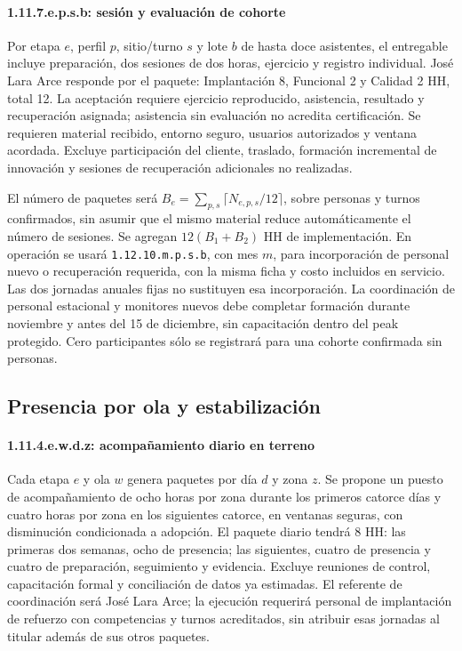\paragraph{1.11.7.e.p.s.b: sesión y evaluación de cohorte}
Por etapa $e$, perfil $p$, sitio/turno $s$ y lote $b$ de hasta doce asistentes, el entregable incluye preparación, dos sesiones de dos horas, ejercicio y registro individual. José Lara Arce responde por el paquete: Implantación 8, Funcional 2 y Calidad 2 HH, total 12. La aceptación requiere ejercicio reproducido, asistencia, resultado y recuperación asignada; asistencia sin evaluación no acredita certificación. Se requieren material recibido, entorno seguro, usuarios autorizados y ventana acordada. Excluye participación del cliente, traslado, formación incremental de innovación y sesiones de recuperación adicionales no realizadas.

El número de paquetes será $B_e=\sum_{p,s}\lceil N_{e,p,s}/12\rceil$, sobre personas y turnos confirmados, sin asumir que el mismo material reduce automáticamente el número de sesiones. Se agregan $12(B_1+B_2)$ HH de implementación. En operación se usará \texttt{1.12.10.m.p.s.b}, con mes $m$, para incorporación de personal nuevo o recuperación requerida, con la misma ficha y costo incluidos en servicio. Las dos jornadas anuales fijas no sustituyen esa incorporación. La coordinación de personal estacional y monitores nuevos debe completar formación durante noviembre y antes del 15 de diciembre, sin capacitación dentro del peak protegido. Cero participantes sólo se registrará para una cohorte confirmada sin personas.

\subsection{Presencia por ola y estabilización}
\paragraph{1.11.4.e.w.d.z: acompañamiento diario en terreno}
Cada etapa $e$ y ola $w$ genera paquetes por día $d$ y zona $z$. Se propone un puesto de acompañamiento de ocho horas por zona durante los primeros catorce días y cuatro horas por zona en los siguientes catorce, en ventanas seguras, con disminución condicionada a adopción. El paquete diario tendrá 8 HH: las primeras dos semanas, ocho de presencia; las siguientes, cuatro de presencia y cuatro de preparación, seguimiento y evidencia. Excluye reuniones de control, capacitación formal y conciliación de datos ya estimadas. El referente de coordinación será José Lara Arce; la ejecución requerirá personal de implantación de refuerzo con competencias y turnos acreditados, sin atribuir esas jornadas al titular además de sus otros paquetes.

